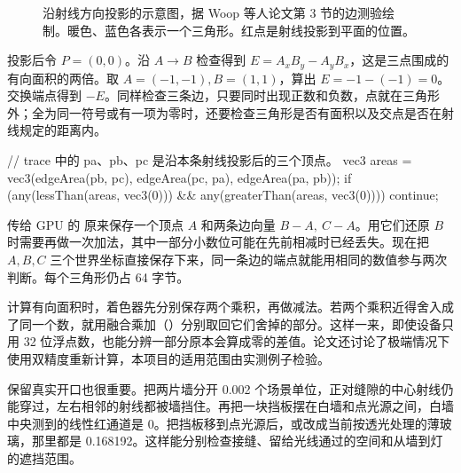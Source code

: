 \begin{figure}[H]\centering
{}
\caption{沿射线方向投影的示意图，据 Woop 等人论文第 3 节的边测验绘制。暖色、蓝色各表示一个三角形。红点是射线投影到平面的位置。}
\end{figure}

投影后令 $P=(0,0)$。沿 $A\rightarrow B$ 检查得到 $E=A_x B_y-A_y B_x$，这是三点围成的有向面积的两倍。取 $A=(-1,-1),B=(1,1)$，算出 $E=-1-(-1)=0$。交换端点得到 $-E$。同样检查三条边，只要同时出现正数和负数，点就在三角形外；全为同一符号或有一项为零时，还要检查三角形是否有面积以及交点是否在射线规定的距离内。

\begin{Code}
// trace 中的 pa、pb、pc 是沿本条射线投影后的三个顶点。
vec3 areas = vec3(edgeArea(pb, pc), edgeArea(pc, pa), edgeArea(pa, pb));
if (any(lessThan(areas, vec3(0))) && any(greaterThan(areas, vec3(0)))) continue;
\end{Code}

传给 GPU 的  原来保存一个顶点 $A$ 和两条边向量 $B-A,\ C-A$。用它们还原 $B$ 时需要再做一次加法，其中一部分小数位可能在先前相减时已经丢失。现在把 $A,B,C$ 三个世界坐标直接保存下来，同一条边的端点就能用相同的数值参与两次判断。每个三角形仍占 64 字节。

计算有向面积时，着色器先分别保存两个乘积，再做减法。若两个乘积近得舍入成了同一个数，就用融合乘加（）分别取回它们舍掉的部分。这样一来，即使设备只用 32 位浮点数，也能分辨一部分原本会算成零的差值。论文还讨论了极端情况下使用双精度重新计算，本项目的适用范围由实测例子检验。

保留真实开口也很重要。把两片墙分开 0.002 个场景单位，正对缝隙的中心射线仍能穿过，左右相邻的射线都被墙挡住。再把一块挡板摆在白墙和点光源之间，白墙中央测到的线性红通道是 0。把挡板移到点光源后，或改成当前按透光处理的薄玻璃，那里都是 0.168192。这样能分别检查接缝、留给光线通过的空间和从墙到灯的遮挡范围。


